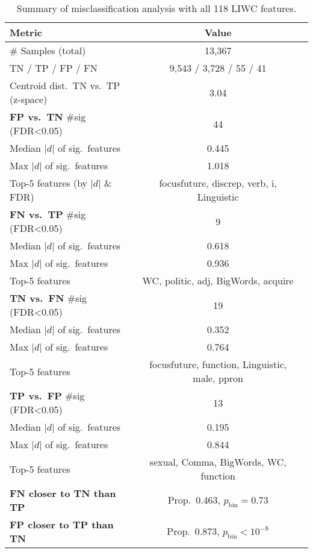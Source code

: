 \begin{table}[H]
\centering
\caption{Summary of misclassification analysis with all 118 LIWC features.}
\label{tab:liwc-misclass-all}
\begin{tabular}{lcc}
\toprule
Metric & Value \\
\midrule
\# Samples (total) & 13,367 \\
TN / TP / FP / FN & 9,543 / 3,728 / 55 / 41 \\
Centroid dist.\ TN vs.\ TP (z-space) & 3.04 \\
\midrule
\textbf{FP vs.\ TN} \#sig (FDR<0.05) & 44 \\
Median $|d|$ of sig.\ features & 0.445 \\
Max $|d|$ of sig.\ features & 1.018 \\
Top-5 features (by $|d|$ \& FDR) & focusfuture, discrep, verb, i, Linguistic \\
\midrule
\textbf{FN vs.\ TP} \#sig (FDR<0.05) & 9 \\
Median $|d|$ of sig.\ features & 0.618 \\
Max $|d|$ of sig.\ features & 0.936 \\
Top-5 features & WC, politic, adj, BigWords, acquire \\
\midrule
\textbf{TN vs.\ FN} \#sig (FDR<0.05) & 19 \\
Median $|d|$ of sig.\ features & 0.352 \\
Max $|d|$ of sig.\ features & 0.764 \\
Top-5 features & focusfuture, function, Linguistic, male, ppron \\
\midrule
\textbf{TP vs.\ FP} \#sig (FDR<0.05) & 13 \\
Median $|d|$ of sig.\ features & 0.195 \\
Max $|d|$ of sig.\ features & 0.844 \\
Top-5 features & sexual, Comma, BigWords, WC, function \\
\midrule
\textbf{FN closer to TN than TP} & Prop.\ 0.463, $p_{\text{bin}}=0.73$ \\
\textbf{FP closer to TP than TN} & Prop.\ 0.873, $p_{\text{bin}}<10^{-8}$ \\
\bottomrule
\end{tabular}
\end{table}


